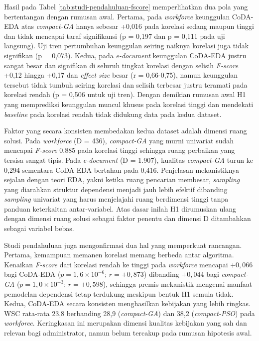 Hasil pada Tabel \ref{tab:studi-pendahuluan-fscore} memperlihatkan dua pola yang bertentangan dengan rumusan awal.
Pertama, pada \textit{workforce} keunggulan CoDA-EDA atas \textit{compact-GA} hanya sebesar +0,016 pada korelasi sedang maupun tinggi dan tidak mencapai taraf signifikansi (p = 0,197 dan p = 0,111 pada uji langsung).
Uji tren pertumbuhan keunggulan seiring naiknya korelasi juga tidak signifikan (p = 0,073).
Kedua, pada \textit{e-document} keunggulan CoDA-EDA justru sangat besar dan signifikan di seluruh tingkat korelasi dengan selisih \textit{F-score} +0,12 hingga +0,17 dan \textit{effect size} besar (r = 0,66-0,75), namun keunggulan tersebut tidak tumbuh seiring korelasi dan selisih terbesar justru teramati pada korelasi rendah (p = 0,506 untuk uji tren).
Dengan demikian rumusan awal H1 yang memprediksi keunggulan muncul khusus pada korelasi tinggi dan mendekati \textit{baseline} pada korelasi rendah tidak didukung data pada kedua dataset.

Faktor yang secara konsisten membedakan kedua dataset adalah dimensi ruang solusi.
Pada \textit{workforce} (D = 436), \textit{compact-GA} yang murni univariat sudah mencapai \textit{F-score} 0,885 pada korelasi tinggi sehingga ruang perbaikan yang tersisa sangat tipis.
Pada \textit{e-document} (D = 1.907), kualitas \textit{compact-GA} turun ke 0,294 sementara CoDA-EDA bertahan pada 0,416.
Penjelasan mekanistiknya sejalan dengan teori EDA, yakni ketika ruang pencarian membesar, \textit{sampling} yang diarahkan struktur dependensi menjadi jauh lebih efektif dibanding \textit{sampling} univariat yang harus menjelajahi ruang berdimensi tinggi tanpa panduan keterkaitan antar-variabel.
Atas dasar inilah H1 dirumuskan ulang dengan dimensi ruang solusi sebagai faktor penentu dan dimensi D ditambahkan sebagai variabel bebas.

Studi pendahuluan juga mengonfirmasi dua hal yang memperkuat rancangan.
Pertama, kemampuan memanen korelasi memang berbeda antar algoritma.
Kenaikan \textit{F-score} dari korelasi rendah ke tinggi pada \textit{workforce} mencapai $+0{,}066$ bagi CoDA-EDA ($p = 1{,}6 \times 10^{-6}$; $r = +0{,}873$) dibanding $+0{,}044$ bagi \textit{compact-GA} ($p = 1{,}0 \times 10^{-3}$; $r = +0{,}598$), sehingga premis mekanistik mengenai manfaat pemodelan dependensi tetap terdukung meskipun bentuk H1 semula tidak.
Kedua, CoDA-EDA secara konsisten menghasilkan kebijakan yang lebih ringkas.
WSC rata-rata 23,8 berbanding 28,9 (\textit{compact-GA}) dan 38,2 (\textit{compact-PSO}) pada \textit{workforce}.
Keringkasan ini merupakan dimensi kualitas kebijakan yang sah dan relevan bagi administrator, namun belum tercakup pada rumusan hipotesis awal.

